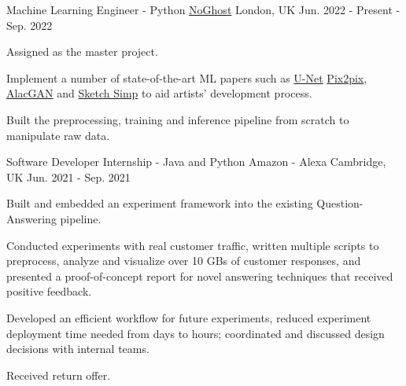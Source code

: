 

\begin{cventries}
  \cventry
  {Machine Learning Engineer - Python} %
  {\href{https://www.noghost.co.uk/}{NoGhost}} %
  {London, UK} %
  {Jun. 2022 - Present - Sep. 2022} %
  {
    \begin{cvitems} %
      \item {Assigned as the master project.}
      \item {Implement a number of state-of-the-art ML papers such as \href{https://arxiv.org/abs/1505.04597}{U-Net} \href{https://arxiv.org/pdf/1611.07004.pdf}{Pix2pix}, \href{https://arxiv.org/abs/1808.03240}{AlacGAN} and \href{https://esslab.jp/~ess/en/research/sketch/}{Sketch Simp} to aid artists' development process.}
      \item {Built the preprocessing, training and inference pipeline from scratch to manipulate raw data.}
    \end{cvitems}
  }

  \cventry
    {Software Developer Internship - Java and Python} %
    {Amazon - Alexa} %
    {Cambridge, UK} %
    {Jun. 2021 - Sep. 2021} %
    {
      \begin{cvitems} %
        \item {Built and embedded an experiment framework into the existing Question-Answering pipeline.}
        \item {Conducted experiments with real customer traffic, written multiple scripts to preprocess, analyze and visualize over 10 GBs of customer responses, and presented a proof-of-concept report for novel answering techniques that received positive feedback.}
        \item {Developed an efficient workflow for future experiments, reduced experiment deployment time needed from days to hours; coordinated and discussed design decisions with internal teams.}
        \item {Received return offer.}
      \end{cvitems}
    }


\end{cventries}
